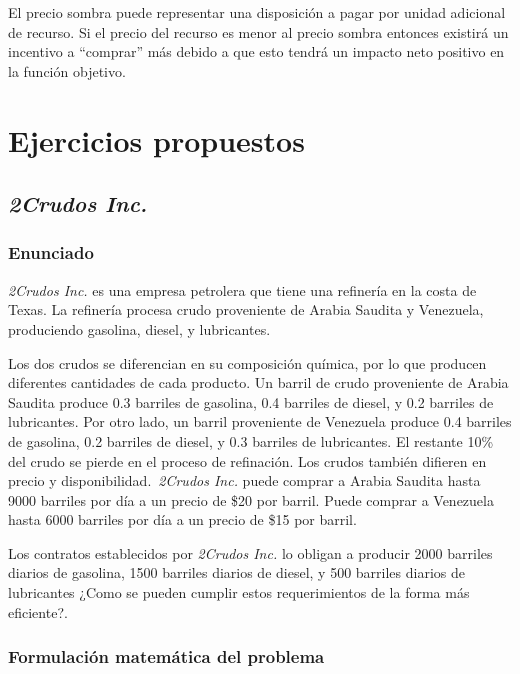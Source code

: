 \documentclass[conference]{IEEEtran}
\begin{document}
El precio sombra puede representar una disposición a pagar por unidad
adicional de recurso. Si el precio del recurso es menor al precio sombra
entonces existirá un incentivo a ``comprar'' más debido a que esto tendrá un
impacto neto positivo en la función objetivo.

\section{Ejercicios propuestos}

\subsection{\textit{2Crudos Inc.}}

\subsubsection{Enunciado}

\textit{2Crudos Inc.} es una empresa petrolera que tiene una refinería en
la costa de Texas. La refinería procesa crudo proveniente de Arabia Saudita y
Venezuela, produciendo gasolina, diesel, y lubricantes.

Los dos crudos se diferencian en su composición química, por lo que
producen diferentes cantidades de cada producto. Un barril de crudo
proveniente de Arabia Saudita produce 0.3 barriles de gasolina, 0.4 barriles
de diesel, y 0.2 barriles de lubricantes. Por otro lado, un barril proveniente
de Venezuela produce 0.4 barriles de gasolina, 0.2 barriles de diesel, y
0.3 barriles de lubricantes. El restante 10\% del crudo se pierde en el
proceso de refinación. Los crudos también difieren en precio y
disponibilidad.~\textit{2Crudos Inc.} puede comprar a Arabia Saudita hasta 9000
barriles por día a un precio de \$20 por barril. Puede comprar a Venezuela
hasta 6000 barriles por día a un precio de \$15 por barril.

Los contratos establecidos por \textit{2Crudos Inc.} lo obligan a producir 2000
barriles diarios de gasolina, 1500 barriles diarios de diesel, y 500
barriles diarios de lubricantes ¿Como se pueden cumplir estos requerimientos
de la forma más eficiente?.

\subsubsection{Formulación matemática del problema}

\hfil{}
\end{document}
